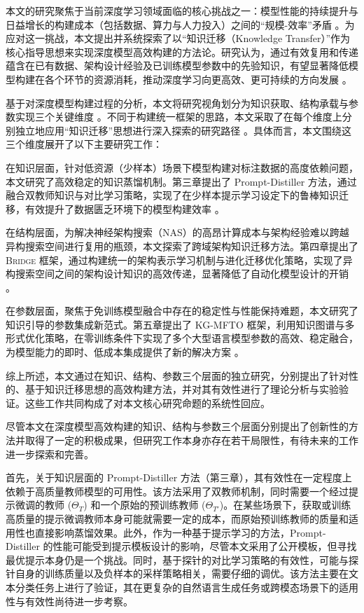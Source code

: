 \documentclass[../main.tex]{subfiles}
\begin{document}
\label{sec:ch6-conclusion}


本文的研究聚焦于当前深度学习领域面临的核心挑战之一：模型性能的持续提升与日益增长的构建成本（包括数据、算力与人力投入）之间的“规模-效率”矛盾 。为应对这一挑战，本文提出并系统探索了以“知识迁移（Knowledge Transfer）”作为核心指导思想来实现深度模型高效构建的方法论。研究认为，通过有效复用和传递蕴含在已有数据、架构设计经验及已训练模型参数中的先验知识，有望显著降低模型构建在各个环节的资源消耗，推动深度学习向更高效、更可持续的方向发展 。

基于对深度模型构建过程的分析，本文将研究视角划分为知识获取、结构承载与参数实现三个关键维度 。不同于构建统一框架的思路，本文采取了在每个维度上分别独立地应用“知识迁移”思想进行深入探索的研究路径 。具体而言，本文围绕这三个维度展开了以下主要研究工作：

在知识层面，针对低资源（少样本）场景下模型构建对标注数据的高度依赖问题，本文研究了高效稳定的知识蒸馏机制。第三章提出了 Prompt-Distiller 方法，通过融合双教师知识与对比学习策略，实现了在少样本提示学习设定下的鲁棒知识迁移，有效提升了数据匮乏环境下的模型构建效率 。

在结构层面，为解决神经架构搜索（NAS）的高昂计算成本与架构经验难以跨越异构搜索空间进行复用的瓶颈，本文探索了跨域架构知识迁移方法。第四章提出了 \textsc{Bridge} 框架，通过构建统一的架构表示学习机制与进化迁移优化策略，实现了异构搜索空间之间的架构设计知识的高效传递，显著降低了自动化模型设计的开销 。

在参数层面，聚焦于免训练模型融合中存在的稳定性与性能保持难题，本文研究了知识引导的参数集成新范式。第五章提出了 KG-MFTO 框架，利用知识图谱与多形式优化策略，在零训练条件下实现了多个大型语言模型参数的高效、稳定融合，为模型能力的即时、低成本集成提供了新的解决方案 。

综上所述，本文通过在知识、结构、参数三个层面的独立研究，分别提出了针对性的、基于知识迁移思想的高效构建方法，并对其有效性进行了理论分析与实验验证。这些工作共同构成了对本文核心研究命题的系统性回应。


尽管本文在深度模型高效构建的知识、结构与参数三个层面分别提出了创新性的方法并取得了一定的积极成果，但研究工作本身亦存在若干局限性，有待未来的工作进一步探索和完善。

首先，关于知识层面的 Prompt-Distiller 方法（第三章），其有效性在一定程度上依赖于高质量教师模型的可用性。该方法采用了双教师机制，同时需要一个经过提示微调的教师 ($\Theta_T$) 和一个原始的预训练教师 ($\Theta_{T'}$)。在某些场景下，获取或训练高质量的提示微调教师本身可能就需要一定的成本，而原始预训练教师的质量和适用性也直接影响蒸馏效果。此外，作为一种基于提示学习的方法，Prompt-Distiller 的性能可能受到提示模板设计的影响，尽管本文采用了公开模板，但寻找最优提示本身仍是一个挑战。同时，基于探针的对比学习策略的有效性，可能与探针自身的训练质量以及负样本的采样策略相关，需要仔细的调优。该方法主要在文本分类任务上进行了验证，其在更复杂的自然语言生成任务或跨模态场景下的适用性与有效性尚待进一步考察。
\end{document}

